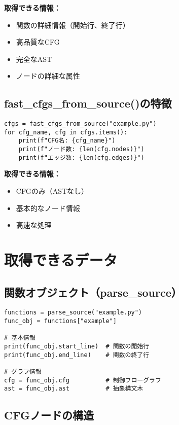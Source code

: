 \documentclass[12pt,a4paper]{article}
\begin{document}
\textbf{取得できる情報：}
\begin{itemize}
    \item 関数の詳細情報（開始行、終了行）
    \item 高品質なCFG
    \item 完全なAST
    \item ノードの詳細な属性
\end{itemize}

\subsection{fast\_cfgs\_from\_source()の特徴}

\begin{lstlisting}
cfgs = fast_cfgs_from_source("example.py")
for cfg_name, cfg in cfgs.items():
    print(f"CFG名: {cfg_name}")
    print(f"ノード数: {len(cfg.nodes)}")
    print(f"エッジ数: {len(cfg.edges)}")
\end{lstlisting}

\textbf{取得できる情報：}
\begin{itemize}
    \item CFGのみ（ASTなし）
    \item 基本的なノード情報
    \item 高速な処理
\end{itemize}

\section{取得できるデータ}

\subsection{関数オブジェクト（parse\_source）}

\begin{lstlisting}
functions = parse_source("example.py")
func_obj = functions["example"]

# 基本情報
print(func_obj.start_line)  # 関数の開始行
print(func_obj.end_line)    # 関数の終了行

# グラフ情報
cfg = func_obj.cfg          # 制御フローグラフ
ast = func_obj.ast          # 抽象構文木
\end{lstlisting}

\subsection{CFGノードの構造}
\end{document}
